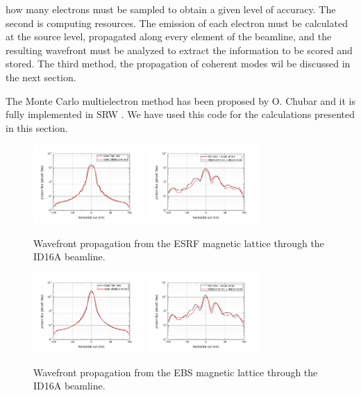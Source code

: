 \documentclass{iucr}              %
\begin{document}
how many electrons must be sampled to obtain a given level of accuracy. The second is computing resources. The emission of each electron must be calculated at the source level, propagated along every element of the beamline, and the resulting wavefront must be analyzed to extract the information to be scored and stored. The third method, the propagation of coherent modes wil be discussed in the next section. 

The Monte Carlo multielectron method has been proposed by O. Chubar and it is fully implemented in SRW \cite{codeSRW}. We have used this code for the calculations presented in this section.  

\begin{figure}
    \centering
        \includegraphics[width=4.25cm]{GRAPHICS/esrf_idealTE_idealOE_h.pdf}
        \includegraphics[width=4.25cm]{GRAPHICS/esrf_slopeTE_slopeOE_h.pdf}
    \label{fig:FiniteEmittanceA}
    \caption{Wavefront propagation from the ESRF magnetic lattice through the ID16A beamline.}
\end{figure}

\begin{figure}
    \centering
        \includegraphics[width=4.25cm]{GRAPHICS/ebs_idealTE_idealOE_h.pdf}
        \includegraphics[width=4.25cm]{GRAPHICS/ebs_slopeTE_slopeOE_h.pdf}
    \label{fig:FiniteEmittanceB}
    \caption{Wavefront propagation from the EBS magnetic lattice through the ID16A beamline.}
\end{figure}
\end{document}
